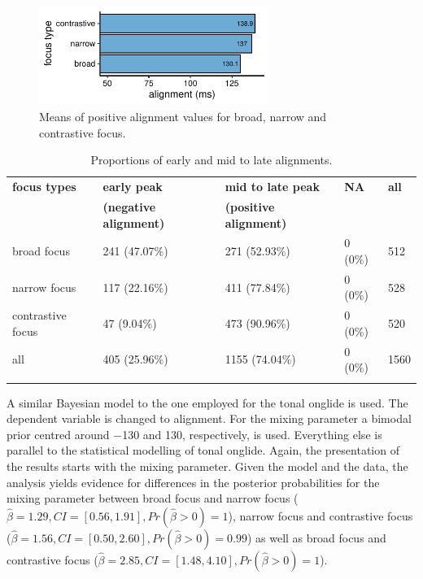 \begin{figure}[p]
\includegraphics[width=7.5cm]{figures/ch6/alignment_mid_late_means.pdf}
\caption{Means of positive alignment values for broad, narrow and contrastive focus.}
\label{fig:alignment_means}
\end{figure}

\begin{table}[p]
	\caption{Proportions of early and mid to late alignments.}
	\begin{tabularx}{\textwidth}{Xllll}
		\lsptoprule
		\textbf{focus types	} &	\textbf{early peak}&		\textbf{mid to late peak} &		\textbf{NA} & 	\textbf{all}\\
		&				\textbf{(negative alignment)} &	\textbf{(positive alignment)} &		&			\\	
		\midrule
		broad focus &		241 (47.07\%) & 				271 (52.93\%)  & 					0 (0\%) &			512	\\
		narrow focus &		117 (22.16\%)  &				411 (77.84\%) & 					0 (0\%)  &			528 \\
		contrastive focus &		47 (9.04\%)  &					473 (90.96\%) &						0 (0\%) &			520 \\
		\midrule
		all &				405 (25.96\%) &					1155 (74.04\%)  &					0 (0\%) &			1560	\\\lspbottomrule
	\end{tabularx}
	\label{tab:props_alignment}
\end{table}%

A similar Bayesian model to the one employed for the tonal onglide is used. The dependent variable is changed to alignment. For the mixing parameter a bimodal prior centred around −130 and 130, respectively, is used. Everything else is parallel to the statistical modelling of tonal onglide. Again, the presentation of the results starts with the mixing parameter. Given the model and the data, the analysis yields evidence for differences in the posterior probabilities for the mixing parameter between broad focus and narrow focus ($\hat\beta=1.29 , CI=[0.56, 1.91], \allowbreak Pr(\hat\beta>0)=1$), narrow focus and contrastive focus ($\hat\beta=1.56, CI=[0.50, 2.60],\allowbreak Pr (\hat\beta>0)=0.99$) as well as broad focus and contrastive focus ($\hat\beta = 2.85, CI=[1.48, 4.10], \allowbreak Pr(\hat\beta>0)=1$).

